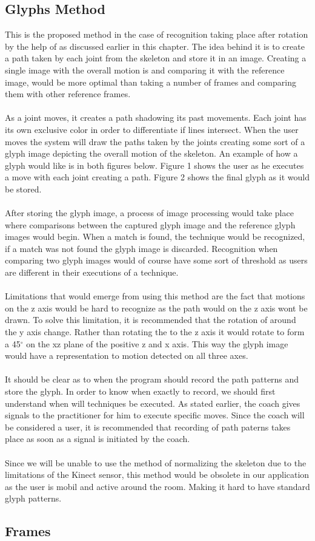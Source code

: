 \subsection{Glyphs Method}
This is the proposed method in the case of recognition taking place after rotation by the help of \N as discussed earlier in this chapter. The idea behind it is to create a path taken by each joint from the skeleton and store it in an image. Creating a single image with the overall motion is and comparing it with the reference image, would be more optimal than taking a number of frames and comparing them with other reference frames.
\\
\\
As a joint moves, it creates a path shadowing its past movements. Each joint has its own exclusive color in order to differentiate if lines intersect. When the user moves the system will draw the paths taken by the joints creating some sort of a glyph image depicting the overall motion of the skeleton. An example of how a glyph would like is in both figures below. Figure 1 shows the user as he executes a move with each joint creating a path. Figure 2 shows the final glyph as it would be stored.
\\
\\
After storing the glyph image, a process of image processing would take place where comparisons between the captured glyph image and the reference glyph images would begin. When a match is found, the technique would be recognized, if a match was not found the glyph image is discarded. Recognition when comparing two glyph images would of course have some sort of threshold as users are different in their executions of a technique.
\\
\\
Limitations that would emerge from using this method are the fact that motions on the z axis would be hard to recognize as the path would on the z axis wont be drawn. To solve this limitation, it is recommended that the rotation of \N around the y axis change. Rather than rotating the \N to the z axis it would rotate to form a 45$^\circ$ on the xz plane of the positive z and x axis. This way the glyph image would have a representation to motion detected on all three axes.
\\
\\
It should be clear as to when the program should record the path patterns and store the glyph. In order to know when exactly to record, we should first understand when will techniques be executed. As stated earlier, the coach gives signals to the practitioner for him to execute specific moves. Since the coach will be considered a user, it is recommended that recording of path paterns takes place as soon as a signal is initiated by the coach.
\\
\\
Since we will be unable to use the method of normalizing the skeleton due to the limitations of the Kinect sensor, this method would be obsolete in our application as the user is mobil and active around the room. Making it hard to have standard glyph patterns.

\subsection{Frames}